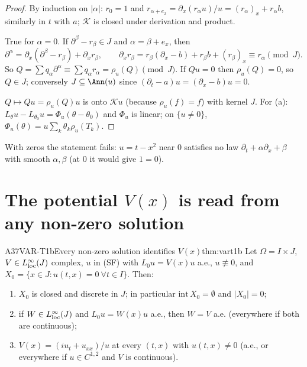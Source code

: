 \begin{proof}
By induction on $|\alpha|$: $r_0=1$ and $r_{\alpha+e_x}=\partial_x(r_\alpha u)/u=(r_\alpha)_x+r_\alpha b$, similarly in $t$ with $a$; $\mathcal K$ is closed under derivation and product.

True for $\alpha=0$. If $\partial^\beta-r_\beta\in J$ and $\alpha=\beta+e_x$, then
\[
\partial^\alpha=\partial_x(\partial^\beta-r_\beta)+\partial_xr_\beta,\qquad \partial_xr_\beta=r_\beta(\partial_x-b)+r_\beta b+(r_\beta)_x\equiv r_\alpha\pmod J .
\]
So $Q=\sum q_\alpha\partial^\alpha\equiv\sum q_\alpha r_\alpha=\rho_u(Q)\pmod J$. If $Qu=0$ then $\rho_u(Q)=0$, so $Q\in J$; conversely $J\subseteq\Ann(u)$ since $(\partial_t-a)u=(\partial_x-b)u=0$.

$Q\mapsto Qu=\rho_u(Q)u$ is onto $\mathcal K u$ (because $\rho_u(f)=f$) with kernel $J$. For (a): $L_\theta u-L_{\theta_0}u=\Phi_u(\theta-\theta_0)$ and $\Phi_u$ is linear; on $\{u\ne0\}$, $\Phi_u(\theta)=u\sum_k\theta_k\rho_u(T_k)$.

\end{proof}

\begin{caution}[title=The hypothesis ``no zeros'' cannot be dropped]
With zeros the statement fails: $u=t-x^2$ near $0$ satisfies no law $\partial_t+\alpha\partial_x+\beta$ with smooth $\alpha,\beta$ (at $0$ it would give $1=0$).
\end{caution}

\section{The potential $V(x)$ is read from any non-zero solution}

\begin{dimcard}{A37}{VAR-T1b}{Every non-zero solution identifies $V(x)$}{\proved}{thm:vart1b}
Let $\Omega=I\times J$, $V\in L^\infty_{\rm loc}(J)$ complex, $u$ in (SF) with $L_0u=V(x)u$ a.e., $u\not\equiv0$, and $X_0=\{x\in J:u(t,x)=0\ \forall t\in I\}$. Then:
\begin{enumerate}[label=(\roman*)]
\item $X_0$ is closed and discrete in $J$; in particular $\mathrm{int}\,X_0=\emptyset$ and $|X_0|=0$;
\item if $W\in L^\infty_{\rm loc}(J)$ and $L_0u=W(x)u$ a.e., then $W=V$ a.e. (everywhere if both are continuous);
\item $V(x)=(iu_t+u_{xx})/u$ at every $(t,x)$ with $u(t,x)\ne0$ (a.e., or everywhere if $u\in C^{1,2}$ and $V$ is continuous).
\end{enumerate}
\end{dimcard}

